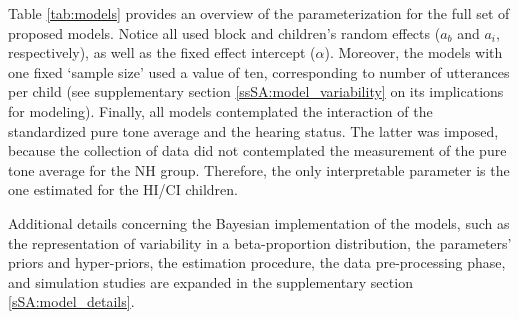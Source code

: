 Table \ref{tab:models} provides an overview of the parameterization for the full set of proposed models. Notice all used block and children's random effects ($a_{b}$ and $a_{i}$, respectively), as well as the fixed effect intercept ($\alpha$). Moreover, the models with one fixed `sample size' used a value of ten, corresponding to number of utterances per child (see supplementary section \ref{ssSA:model_variability} on its implications for modeling). Finally, all models contemplated the interaction of the standardized pure tone average and the hearing status. The latter was imposed, because the collection of data did not contemplated the measurement of the pure tone average for the NH group. Therefore, the only interpretable parameter is the one estimated for the HI/CI children.

Additional details concerning the Bayesian implementation of the models, such as the representation of variability in a beta-proportion distribution, the parameters' priors and hyper-priors, the estimation procedure, the data pre-processing phase, and simulation studies are expanded in the supplementary section \ref{sSA:model_details}.
%
